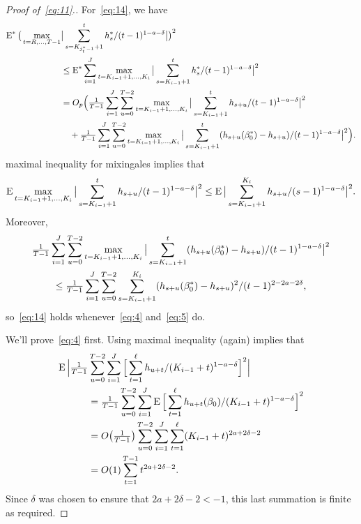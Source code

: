 \documentclass[12pt,fleqn]{article}
\begin{document}
\begin{proof}[Proof of~\eqref{eq:11}.]
For~\eqref{eq:14}, we have
\begin{align*}
  \operatorname{E}^* \big(\max_{t=R,\dots,T-1} &\big|\sum_{s=K_{j^*_t - 1}+1}^t h_s^*/(t-1)^{1-a-\delta} \big|\big)^2 \\
  &\leq \operatorname{E}^* \sum_{i=1}^{J} \max_{t = K_{i-1}+1,\dots,K_i} \big| \sum_{s=K_{i-1}+1}^t h_s^*/(t-1)^{1-a-\delta} \big|^2 \\
  &= O_p\Big(\tfrac{1}{T-1} \sum_{i=1}^{J} \sum_{u=0}^{T-2} \max_{t = K_{i-1}+1,\dots,K_i} \big| \sum_{s=K_{i-1}+1}^t h_{s+u} /(t-1)^{1-a-\delta} \big|^2 \\
  &\quad+ \tfrac{1}{T-1} \sum_{i=1}^{J} \sum_{u=0}^{T-2} \max_{t = K_{i-1}+1,\dots,K_i} \big| \sum_{s=K_{i-1}+1}^t (h_{s+u}(\beta_0^*) - h_{s+u}) /(t-1)^{1-a-\delta} \big|^2\Big).
\end{align*}
 maximal inequality for mixingales implies that
\begin{equation*}
  \operatorname{E} \max_{t = K_{i-1}+1,\dots,K_i} \big| \sum_{s=K_{i-1}+1}^t h_{s+u} /(t-1)^{1-a-\delta} \big|^2
  \leq \operatorname{E} \big| \sum_{s=K_{i-1}+1}^{K_i} h_{s+u} /(s-1)^{1-a-\delta} \big|^2.
\end{equation*}
Moreover,
\begin{multline*}
  \tfrac{1}{T-1} \sum_{i=1}^{J} \sum_{u=0}^{T-2} \max_{t = K_{i-1}+1,\dots,K_i} \big| \sum_{s=K_{i-1}+1}^t (h_{s+u}(\beta_0^*) - h_{s+u}) /(t-1)^{1-a-\delta} \big|^2 \\
  \leq \tfrac{1}{T-1} \sum_{i=1}^{J} \sum_{u=0}^{T-2} \sum_{s=K_{i-1}+1}^{K_i} (h_{s+u}(\beta_0^*) - h_{s+u})^2 /(t-1)^{2-2a-2\delta},
\end{multline*}
so~\eqref{eq:14} holds whenever~\eqref{eq:4} and~\eqref{eq:5} do.

We'll prove~\eqref{eq:4} first. Using  maximal
inequality (again) implies that
\begin{align*}
  \operatorname{E}\Big|\tfrac{1}{T-1}
  &\sum_{u = 0}^{T-2} \sum_{i=1}^J \Big[\sum_{t = 1}^{\ell} h_{u + t}/ (K_{i-1} + t)^{1-a-\delta}\Big]^2 \Big| \\
  &= \tfrac{1}{T-1} \sum_{u = 0}^{T-2} \sum_{i=1}^J \operatorname{E} \Big[\sum_{t = 1}^{\ell} h_{u + t}(\beta_0)/ (K_{i-1} + t)^{1-a-\delta} \Big]^2 \\
  &= O\big(\tfrac{1}{T-1}\big) \sum_{u = 0}^{T-2} \sum_{i=1}^J \sum_{t = 1}^{\ell} (K_{i-1} + t)^{2a + 2\delta-2} \\
  &= O(1) \sum_{t=1}^{T-1} t^{2a+2\delta-2}.
\end{align*}
Since $\delta$ was chosen to ensure that $2a+2\delta-2 < -1$, this
last summation is finite as required.


\end{proof}
\end{document}
